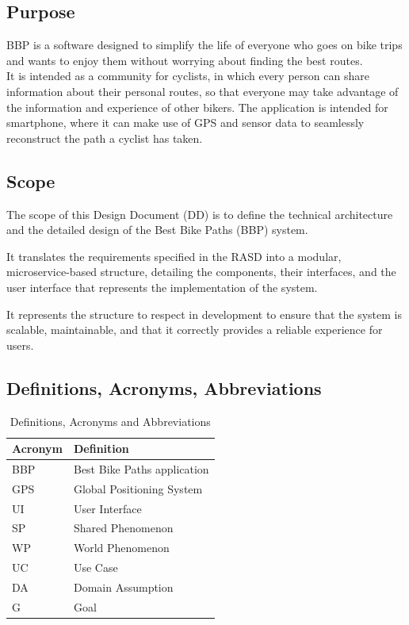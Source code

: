 \subsection{Purpose}
BBP is a software designed to simplify the life of everyone who goes on bike trips and wants to enjoy them without worrying about finding the best routes.\\
It is intended as a community for cyclists, in which every person can share information about their personal routes, so that everyone may take advantage of the information and experience of other bikers.
The application is intended for smartphone, where it can make use of GPS and sensor data to seamlessly reconstruct the path a cyclist has taken.

\subsection{Scope}

The scope of this Design Document (DD) is to define the technical architecture and the detailed design of the Best Bike Paths (BBP) system. 

It translates the requirements specified in the RASD into a modular, microservice-based structure, detailing the components, their interfaces, and the user interface that represents the implementation of the system. 

It represents the structure to respect in development to ensure that the system is scalable, maintainable, and that it correctly provides a reliable experience for users.

\subsection{Definitions, Acronyms, Abbreviations}

\begin{table}[H]
   \begin{tabular}{|p{3cm}|p{12cm}|}
   \hline
   \textbf{Acronym} & \textbf{Definition} \\ \hline
   BBP & Best Bike Paths application \\ \hline
   GPS & Global Positioning System \\ \hline
   UI & User Interface \\ \hline
   SP & Shared Phenomenon \\ \hline
   WP & World Phenomenon \\ \hline
   UC & Use Case \\ \hline
   DA & Domain Assumption \\ \hline
   G & Goal \\ \hline
   \end{tabular}
   \caption{Definitions, Acronyms and Abbreviations}
\end{table}

